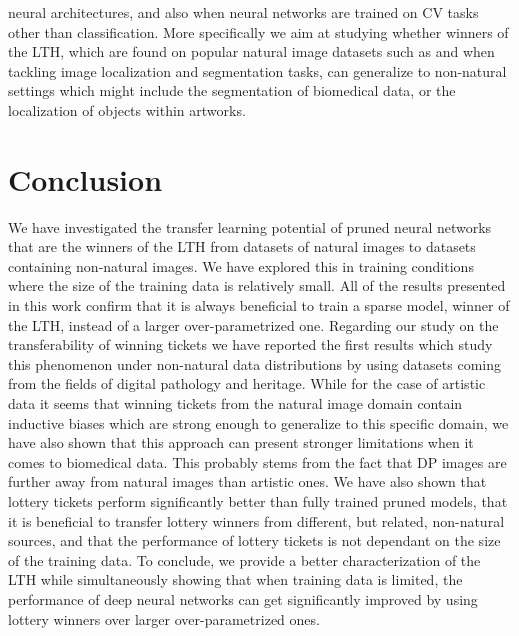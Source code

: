 neural architectures, and also when neural networks are trained on CV tasks other than classification. More specifically we aim at studying whether winners of the LTH, which are found on popular natural image datasets such as \cite{lin2014microsoft} and \cite{everingham2010pascal} when tackling image localization and segmentation tasks, can generalize to non-natural settings which might include the segmentation of biomedical data, or the localization of objects within artworks.       

\section{Conclusion}
\label{sec:conclusion}
We have investigated the transfer learning potential of pruned neural networks that are the winners of the LTH from datasets of natural images to datasets containing non-natural images. We have explored this in training conditions where the size of the training data is relatively small. All of the results presented in this work confirm that it is always beneficial to train a sparse model, winner of the LTH, instead of a larger over-parametrized one. Regarding our study on the transferability of winning tickets we have reported the first results which study this phenomenon under non-natural data distributions by using datasets coming from the fields of digital pathology and heritage. While for the case of artistic data it seems that winning tickets from the natural image domain contain inductive biases which are strong enough to generalize to this specific domain, we have also shown that this approach can present stronger limitations when it comes to biomedical data. This probably stems from the fact that DP images are further away from natural images than artistic ones. We have also shown that lottery tickets perform significantly better than fully trained pruned models, that it is beneficial to transfer lottery winners from different, but related, non-natural sources, and that the performance of lottery tickets is not dependant on the size of the training data. To conclude, we provide a better characterization of the LTH while simultaneously showing that when training data is limited, the performance of deep neural networks can get significantly improved by using lottery winners over larger over-parametrized ones.
